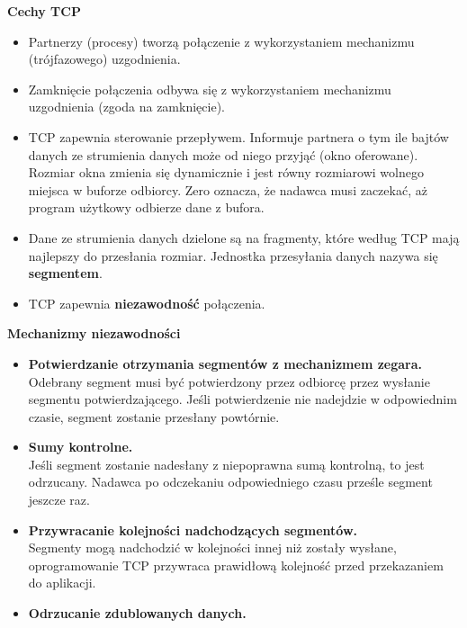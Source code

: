 \documentclass[a4paper]{article}
\begin{document}
\textbf{Cechy TCP}
\begin{itemize}
    \item Partnerzy (procesy) tworzą połączenie z wykorzystaniem mechanizmu (trójfazowego) uzgodnienia.
    \item Zamknięcie połączenia odbywa się z wykorzystaniem mechanizmu uzgodnienia (zgoda na zamknięcie).
    \item TCP zapewnia sterowanie przepływem. Informuje partnera o tym ile bajtów danych ze strumienia danych może od niego przyjąć (okno oferowane). Rozmiar okna zmienia się dynamicznie i jest równy rozmiarowi wolnego miejsca w buforze odbiorcy. Zero oznacza, że nadawca musi zaczekać, aż program użytkowy
odbierze dane z bufora.
    \item Dane ze strumienia danych dzielone są na fragmenty, które według TCP mają najlepszy
do przesłania rozmiar. Jednostka przesyłania danych nazywa się \textbf{segmentem}.
    \item TCP zapewnia \textbf{niezawodność} połączenia.
\end{itemize}

\textbf{Mechanizmy niezawodności}
\begin{itemize}
    \item \textbf{Potwierdzanie otrzymania segmentów z mechanizmem zegara.}\\
     Odebrany segment musi być potwierdzony przez odbiorcę przez wysłanie segmentu potwierdzającego. Jeśli
potwierdzenie nie nadejdzie w odpowiednim czasie, segment zostanie przesłany powtórnie.
    \item \textbf{Sumy kontrolne.}\\
     Jeśli segment zostanie nadesłany z niepoprawna sumą kontrolną, to jest
odrzucany. Nadawca po odczekaniu odpowiedniego czasu prześle segment jeszcze raz.
    \item \textbf{Przywracanie kolejności nadchodzących segmentów.}\\
     Segmenty mogą nadchodzić w kolejności innej niż zostały wysłane, oprogramowanie TCP przywraca prawidłową kolejność przed przekazaniem do aplikacji.
     \item \textbf{Odrzucanie zdublowanych danych.}
\end{itemize}
\end{document}
